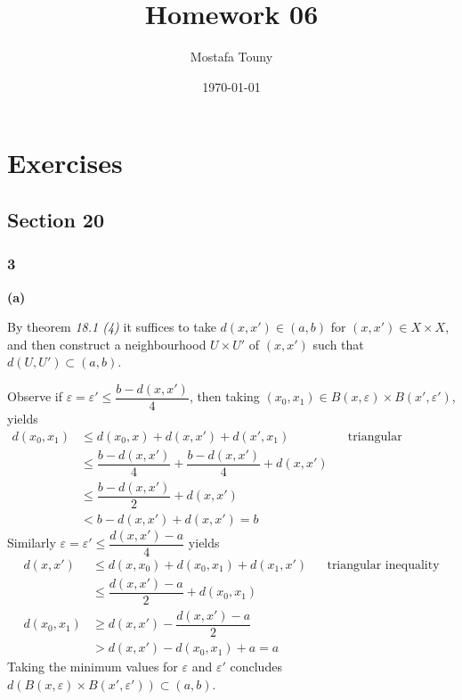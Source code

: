 \documentclass[12pt]{extarticle}
\title{Homework 06}
\author{Mostafa Touny}
\date{\today}
\begin{document}
\maketitle
\tableofcontents

\newpage

\section{Exercises}

\subsection{Section 20}

\subsubsection{3}

\textbf{(a)}

By theorem \textit{18.1 (4)} it suffices to take $d(x,x') \in (a,b)$ for $(x,x') \in X \times X$, and then construct a neighbourhood $U \times U'$ of $(x,x')$ such that $d(U,U') \subset (a,b)$.

Observe if $\varepsilon = \varepsilon' \leq \dfrac{b - d(x,x')}{4}$, then taking $(x_0,x_1) \in B(x, \varepsilon) \times B(x', \varepsilon')$, yields
\begin{align*}
    d(x_0,x_1) &\leq d(x_0,x) + d(x,x') + d(x',x_1) & &\text{triangular inequality} \\
               &\leq \dfrac{b-d(x,x')}{4} + \dfrac{b-d(x,x')}{4} + d(x,x') \\
               &\leq \dfrac{b-d(x,x')}{2} + d(x,x') \\
               &< b - d(x,x') + d(x,x') = b
\end{align*}
Similarly $\varepsilon = \varepsilon' \leq \dfrac{d(x,x') - a}{4}$ yields
\begin{align*}
    d(x,x') &\leq d(x,x_0) + d(x_0,x_1) + d(x_1,x') & &\text{triangular inequality}\\
            &\leq \dfrac{d(x,x') - a}{2} + d(x_0,x_1) \\
    d(x_0,x_1) &\geq d(x,x') - \dfrac{d(x,x') - a}{2} \\
               &> d(x,x') - d(x_0,x_1) + a = a
\end{align*}
Taking the minimum values for $\varepsilon$ and $\varepsilon'$ concludes $d(  B(x,\varepsilon) \times B(x',\varepsilon') ) \subset (a,b)$.
\end{document}
